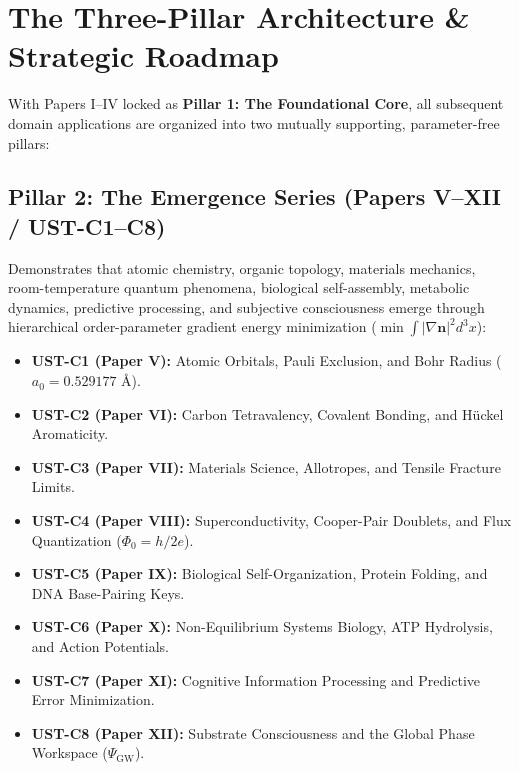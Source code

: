 \documentclass[11pt,a4paper]{article}
\begin{document}
	\section{The Three-Pillar Architecture \& Strategic Roadmap}
	\label{sec:roadmap}
	
	With Papers I--IV locked as \textbf{Pillar 1: The Foundational Core}, all subsequent domain applications are organized into two mutually supporting, parameter-free pillars:
	
	\subsection{Pillar 2: The Emergence Series (Papers V--XII / UST-C1--C8)}
	Demonstrates that atomic chemistry, organic topology, materials mechanics, room-temperature quantum phenomena, biological self-assembly, metabolic dynamics, predictive processing, and subjective consciousness emerge through hierarchical order-parameter gradient energy minimization ($\min \int |\nabla \mathbf{n}|^2 d^3x$):
	\begin{itemize}
		\item \textbf{UST-C1 (Paper V):} Atomic Orbitals, Pauli Exclusion, and Bohr Radius ($a_0 = 0.529177 \text{ \AA}$).
		\item \textbf{UST-C2 (Paper VI):} Carbon Tetravalency, Covalent Bonding, and H\"uckel Aromaticity.
		\item \textbf{UST-C3 (Paper VII):} Materials Science, Allotropes, and Tensile Fracture Limits.
		\item \textbf{UST-C4 (Paper VIII):} Superconductivity, Cooper-Pair Doublets, and Flux Quantization ($\Phi_0 = h/2e$).
		\item \textbf{UST-C5 (Paper IX):} Biological Self-Organization, Protein Folding, and DNA Base-Pairing Keys.
		\item \textbf{UST-C6 (Paper X):} Non-Equilibrium Systems Biology, ATP Hydrolysis, and Action Potentials.
		\item \textbf{UST-C7 (Paper XI):} Cognitive Information Processing and Predictive Error Minimization.
		\item \textbf{UST-C8 (Paper XII):} Substrate Consciousness and the Global Phase Workspace ($\Psi_{\text{GW}}$).
	\end{itemize}
	
\end{document}
